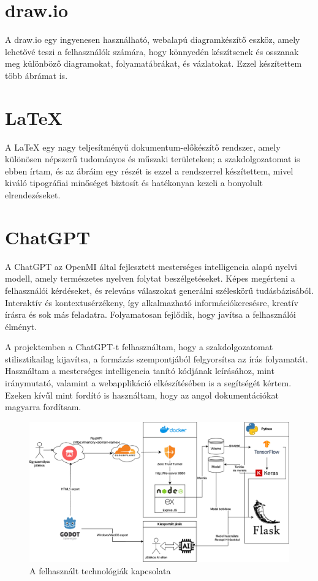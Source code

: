 \section{draw.io}
A draw.io \cite{Aboutdra31:online} egy ingyenesen használható, webalapú diagramkészítő eszköz, amely lehetővé teszi a felhasználók számára, hogy könnyedén készítsenek és osszanak meg különböző diagramokat, folyamatábrákat, és vázlatokat. Ezzel készítettem több ábrámat is. 

\section{LaTeX}
A LaTeX egy nagy teljesítményű dokumentum-előkészítő rendszer, amely különösen népszerű tudományos és műszaki területeken; a szakdolgozatomat is ebben írtam, és az ábráim egy részét is ezzel a rendszerrel készítettem, mivel kiváló tipográfiai minőséget biztosít és hatékonyan kezeli a bonyolult elrendezéseket.

\section{ChatGPT}
A ChatGPT \cite{Introduc55:online} az OpenMI által fejlesztett mesterséges intelligencia alapú nyelvi modell, amely természetes nyelven folytat beszélgetéseket. Képes megérteni a felhasználói kérdéseket, és releváns válaszokat generálni széleskörű tudásbázisából. Interaktív és kontextusérzékeny, így alkalmazható információkeresésre, kreatív írásra és sok más feladatra. Folyamatosan fejlődik, hogy javítsa a felhasználói élményt.

A projektemben a ChatGPT-t felhasználtam, hogy a szakdolgozatomat stilisztikailag kijavítsa, a formázás szempontjából felgyorsítsa az írás folyamatát. Használtam a mesterséges intelligencia tanító kódjának leírásához, mint iránymutató, valamint a webapplikáció elkészítésében is a segítségét kértem. Ezeken kívűl mint fordító is használtam, hogy az angol dokumentációkat magyarra fordítsam. 

\vspace{1cm}

\begin{figure}[h]
    \center
    \includegraphics[width=\textwidth]{img/fullfolyamat.png}
    \caption{A felhasznált technológiák kapcsolata}
    \label{img:technology}
\end{figure}